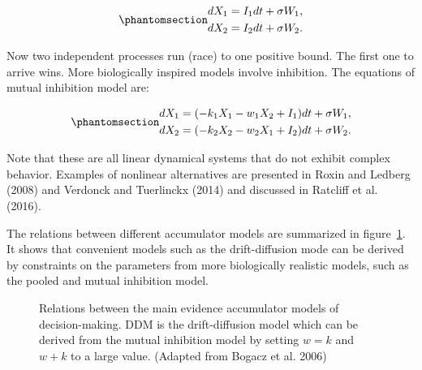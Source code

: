 \documentclass[
  a4paper,
  DIV=11,
  numbers=noendperiod,
  oneside]{scrreprt}
\begin{document}
\begin{equation}\phantomsection\label{eq-ch4n-8-old-28}{
\begin{gathered}
dX_{1} = I_{1}dt + \sigma W_{1}, \\
dX_{2} = I_{2}dt + \sigma W_{2}. 
\end{gathered}
}\end{equation}

Now two independent processes run (race) to one positive bound. The
first one to arrive wins. More biologically inspired models involve
inhibition. The equations of mutual inhibition model are:

\begin{equation}\phantomsection\label{eq-ch4n-9-old-29}{
\begin{gathered}
dX_{1} = (-k_{1}X_{1} - w_{1}X_{2} + I_{1})dt + \sigma W_{1}, \\
dX_{2} = (-k_{2}X_{2} - w_{2}X_{1} + I_{2})dt + \sigma W_{2}.
\end{gathered}
}\end{equation}

Note that these are all linear dynamical systems that do not exhibit
complex behavior. Examples of nonlinear alternatives are presented in
Roxin and Ledberg (2008) and Verdonck and Tuerlinckx (2014) and
discussed in Ratcliff et al. (2016).

The relations between different accumulator models are summarized in
figure~\ref{fig-ch4n-img8-old-56}. It shows that convenient models such
as the drift-diffusion mode can be derived by constraints on the
parameters from more biologically realistic models, such as the pooled
and mutual inhibition model.

\begin{figure}


\caption{\label{fig-ch4n-img8-old-56}Relations between the main evidence
accumulator models of decision-making. DDM is the drift-diffusion model
which can be derived from the mutual inhibition model by setting
\(w = k\) and \(w + k\) to a large value. (Adapted from Bogacz et al.
2006)}

\end{figure}%
\end{document}
